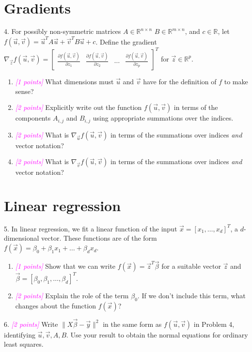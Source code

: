 \documentclass{article}
\newcommand{\R}{\mathbb{R}} %
\newcommand{\points}[1]{\small\textcolor{magenta}{\emph{[#1 points]}} \normalsize}
\begin{document}
\section*{Gradients}
4. For possibly non-symmetric matrices $A \in \R^{n \times n}$
$B \in \R^{m \times n}$,
and $c \in \R$, 
let $f(\vec u, \vec v) = \vec u^T A \vec u + \vec v^T B \vec u + c$. 
Define the gradient 
$
\nabla_{\vec z} f(\vec u, \vec v) = 
\begin{bmatrix} 
\frac{\partial f(\vec u, \vec v)}{\partial z_1} & 
\frac{\partial f(\vec u, \vec v)}{\partial z_2} & 
\dots & \frac{\partial f(\vec u, \vec v)}{\partial z_p} 
\end{bmatrix}^T
$ 
for $\vec z \in \R^p$.
\begin{enumerate}
\item \points{1} What dimensions must $\vec u$ and $\vec v$ have for the definition of $f$ to make sense?
\item \points{2} Explicitly write out the function $f(\vec u, \vec v)$ in terms of the components $A_{i,j}$ and $B_{i,j}$ using appropriate summations over the indices.
\item \points{2} What is $\nabla_{\vec u} f(\vec u, \vec v)$ 
  in terms of the summations over indices \emph{and} vector notation?
\item \points{2} What is $\nabla_{\vec v} f(\vec u, \vec v)$ 
  in terms of the summations over indices \emph{and} vector notation?
\end{enumerate}


\section*{Linear regression}
5. In linear regression, we fit a linear function of the input $\vec x = [x_1, \ldots, x_d]^T$, a $d$-dimensional vector. 
These functions are of the form 
$f(\vec x) = \beta_0 + \beta_1 x_1 + \ldots + \beta_d x_d$.
\begin{enumerate}
\item \points{1} Show that we can write $f(\vec x) = \vec z^T \vec \beta$ for a suitable vector $\vec z$ 
  and $\vec \beta = [\beta_0, \beta_1, \ldots, \beta_d]^T$.
\item \points{2} Explain the role of the term $\beta_0$. If we don't include this term, 
  what changes about the function $f(\vec x)$?
\end{enumerate}

6.  \points{2} Write $\| X \vec \beta - \vec y \|^2$ in the same form as $f(\vec u, \vec v)$ in Problem 4,
identifying $\vec u, \vec v, A, B$.
Use your result to obtain the normal equations for ordinary least squares. 
\end{document}
